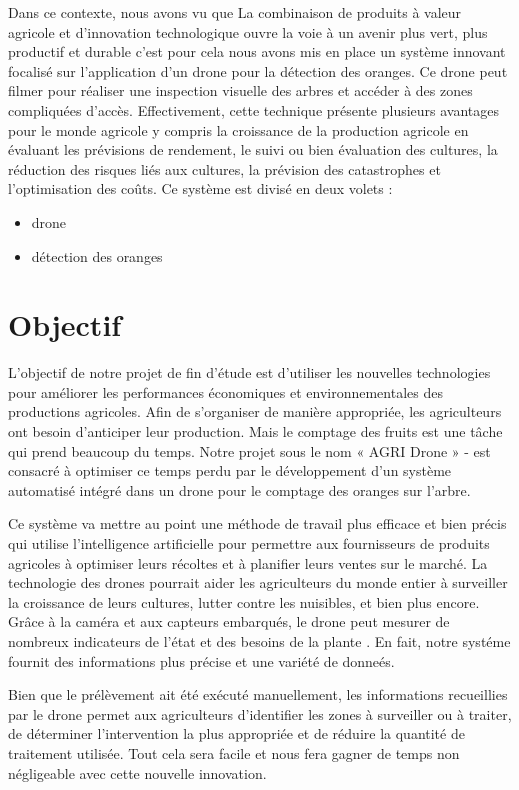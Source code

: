 	Dans ce contexte, nous avons vu que La combinaison de produits à valeur agricole et d’innovation technologique ouvre la voie à un avenir plus vert, plus productif et durable c’est pour cela nous avons mis en place un système innovant focalisé sur l'application d'un drone pour la détection des oranges. Ce drone peut filmer pour réaliser une inspection visuelle des arbres et accéder à des zones compliquées d’accès. Effectivement, cette technique présente plusieurs avantages pour le monde agricole y compris la croissance de la production agricole en évaluant les prévisions de rendement, le suivi ou bien évaluation des cultures, la réduction des risques liés aux cultures, la prévision des catastrophes et l’optimisation des coûts. 
	Ce système est divisé en deux volets :
	\begin{itemize}
		\item  drone 	
		\item détection des oranges
	\end{itemize}
	
	
	\section{Objectif }
	L'objectif de notre projet de fin d’étude est d’utiliser les nouvelles technologies pour améliorer les performances économiques et environnementales des productions agricoles. Afin de s’organiser de manière appropriée, les agriculteurs ont besoin d’anticiper leur production. Mais le comptage des fruits est une tâche qui prend beaucoup du temps. Notre projet sous le nom « AGRI Drone » - est consacré à optimiser ce temps perdu par le développement d’un système automatisé intégré dans un drone pour le comptage des oranges sur l’arbre. 
	
	
	Ce système va mettre au point une méthode de travail plus efficace et bien précis qui utilise l’intelligence artificielle pour permettre aux fournisseurs de produits agricoles à optimiser leurs récoltes et à planifier leurs ventes sur le marché. La technologie des drones pourrait aider les agriculteurs du monde entier à surveiller la croissance de leurs cultures, lutter contre les nuisibles, et bien plus encore. Grâce à la caméra et aux capteurs embarqués, le drone peut mesurer de nombreux indicateurs de l'état et des besoins de la plante . En fait, notre systéme fournit des informations plus précise et une variété de donneés.
	
	Bien que le prélèvement ait été exécuté manuellement, les informations recueillies par le drone permet aux agriculteurs d'identifier les zones à surveiller ou à traiter, de déterminer l'intervention la plus appropriée et de réduire la quantité de traitement utilisée. Tout cela sera facile et nous fera gagner de temps non négligeable avec cette nouvelle innovation.
	
